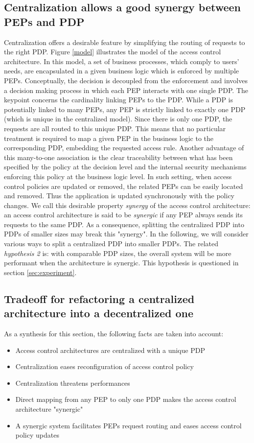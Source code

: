 \subsection{Centralization allows a good synergy between PEPs and PDP}
Centralization offers a desirable feature by simplifying the routing of requests to the right PDP. 
Figure \ref{model} illustrates the model of the access control architecture. In this model, a set of business processes, which comply to users' needs, are encapsulated in a given business logic 
which is enforced by multiple PEPs. Conceptually, the decision is decoupled from the enforcement and involves a decision making process in which each PEP 
interacts with one single PDP. The keypoint concerns the cardinality linking PEPs to the PDP. While a PDP is potentially linked to many PEPs, any PEP is strictly linked to exactly one 
PDP (which is unique in the centralized model). 
Since there is only one PDP, the requests are all routed to this unique PDP. This means that no particular treatment is required to map a given PEP in the business logic to 
the corresponding PDP, embedding the requested access rule. Another advantage of this many-to-one association is the clear traceability between what has been specified by the 
policy at the decision level and the internal security mechanisms enforcing this policy at the business logic level. In such setting, 
when access control policies are updated or removed, the related PEPs can be easily located and removed. Thus the application is updated synchronously 
with the policy changes. We call this desirable property \textit{synergy} of the access control architecture: an access control architecture is said to be \textit{synergic} if any PEP always sends its requests  to the same PDP. 
As a consequence, splitting the centralized PDP into PDPs of smaller sizes may break this "synergy". In the following, we will consider various ways to split a centralized PDP into smaller PDPs. 
The related \textit{hypothesis 2} is: with comparable PDP sizes, the overall system will be more performant when the architecture is synergic. This hypothesis is questioned in 
section \ref{sec:experiment}.

\subsection{Tradeoff for refactoring a centralized architecture into a decentralized one}

As a synthesis for this section, the following facts are taken into account:
\begin{itemize}
 \item Access control architectures are centralized with a unique PDP
\item Centralization eases reconfiguration of access control policy
\item Centralization threatens performances
\item Direct mapping from any PEP to only one PDP makes the access control architecture "synergic"
\item A synergic system facilitates PEPs request routing and eases access control policy updates

\end{itemize}

